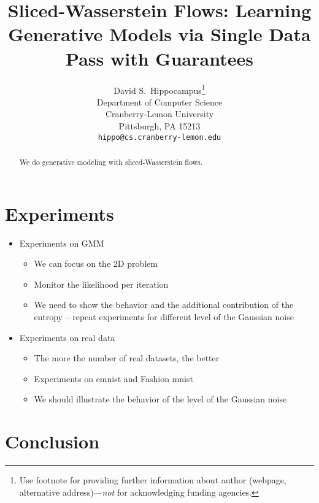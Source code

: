 \documentclass{article}
\title{Sliced-Wasserstein Flows: Learning Generative Models via Single Data Pass with Guarantees}
\author{
  David S.~Hippocampus\thanks{Use footnote for providing further
    information about author (webpage, alternative
    address)---\emph{not} for acknowledging funding agencies.} \\
  Department of Computer Science\\
  Cranberry-Lemon University\\
  Pittsburgh, PA 15213 \\
  \texttt{hippo@cs.cranberry-lemon.edu} \\
}
\begin{document}

\maketitle

\begin{abstract}
We do generative modeling with sliced-Wasserstein flows. 
\end{abstract}











\section{Experiments}

\begin{itemize}
\item Experiments on GMM
\begin{itemize}
\item We can focus on the 2D problem
\item Monitor the likelihood per iteration
\item We need to show the behavior and the additional contribution of the entropy -- repeat experiments for different level of the Gaussian noise
\end{itemize}
\item Experiments on real data
\begin{itemize}
\item The more the number of real datasets, the better
\item Experiments on emnist and Fashion mnist
\item We should illustrate the behavior of the level of the Gaussian noise
\end{itemize}
\end{itemize}

\section{Conclusion}





\end{document}
